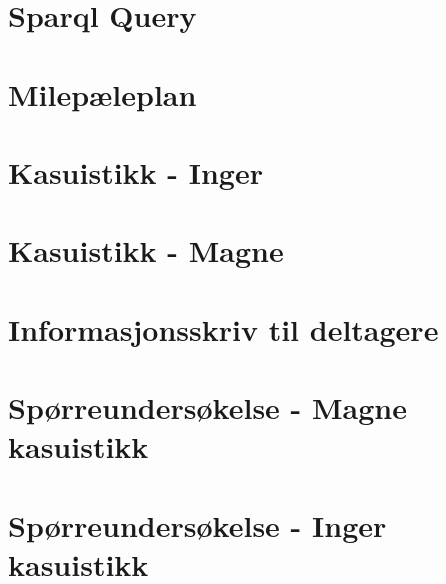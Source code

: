 \titleformat{\chapter}[hang] 
{\normalfont\huge\bfseries}{\chaptertitlename\ \thechapter:}{1em}{} 

\begin{appendices}


\chapter{Sparql Query}\label{vedlegg:sparqlquery}



\chapter{Milepæleplan}\label{vedlegg:milep}


\chapter{Kasuistikk - Inger} \label{vedlegg:kasus_inger}


\chapter{Kasuistikk - Magne} \label{vedlegg:kasus_magne}



\chapter{Informasjonsskriv til deltagere}\label{vedlegg:informasjonsskriv}
\begin{adjustwidth}{2cm}{2cm}

 \end{adjustwidth} 

\chapter{Spørreundersøkelse - Magne kasuistikk}\label{vedlegg:magne}


\chapter{Spørreundersøkelse - Inger kasuistikk}\label{vedlegg:inger}




\end{appendices}
\restoregeometry

